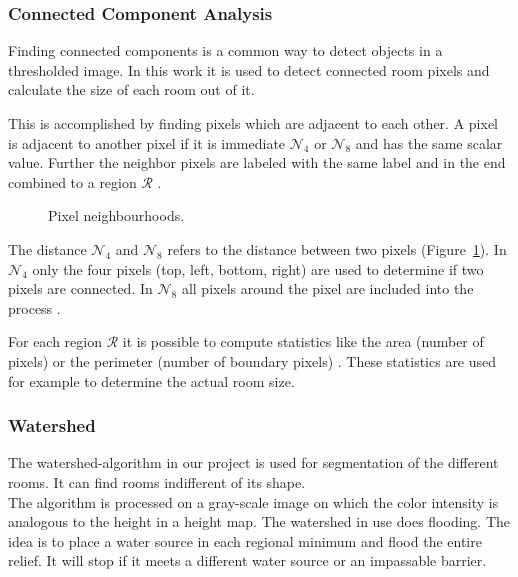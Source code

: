 \subsubsection{Connected Component Analysis}
Finding connected components is a common way to detect objects in a thresholded image. In this work it is used to detect connected room pixels and calculate the size of each room out of it.

This is accomplished by finding pixels which are adjacent to each other. A pixel is adjacent to another pixel if it is immediate $\mathcal{N}_4$ or $\mathcal{N}_8$ and has the same scalar value. Further the neighbor pixels are labeled with the same label and in the end combined to a region $\mathcal{R}$ \citep[Section 3.3.4]{szeliski_2011}.

\begin{figure}[h]
	\centering
	\hfill
	\caption{Pixel neighbourhoods.}
	\label{fig:pixel_neighbourhood}
\end{figure}

The distance $\mathcal{N}_4$ and $\mathcal{N}_8$ refers to the distance between two pixels (Figure~\ref{fig:pixel_neighbourhood}). In $\mathcal{N}_4$ only the four pixels (top, left, bottom, right) are used to determine if two pixels are connected. In $\mathcal{N}_8$ all pixels around the pixel are included into the process \citep{burger_burge_2016}.

For each region $\mathcal{R}$ it is possible to compute statistics like the area (number of pixels) or the perimeter (number of boundary pixels) \citep[Section 3.3.4]{szeliski_2011}. These statistics are used for example to determine the actual room size.

\subsubsection{Watershed}
\label{subsub:watershed}
The watershed-algorithm in our project is used for segmentation of the different rooms. It can find rooms indifferent of its shape.
\\
The algorithm is processed on a gray-scale image on which the color intensity is analogous to the height in a height map. The watershed in use does flooding. The idea is to place a water source in each regional minimum and flood the entire relief. It will stop if it meets a different water source or an impassable barrier.

